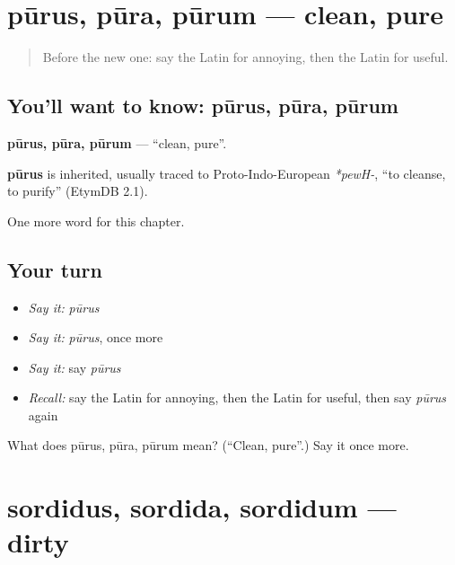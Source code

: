 \section[pūrus, pūra, pūrum]{pūrus, pūra, pūrum — clean, pure}

\label{lesson:LA-C146-purus}



\begin{quote}
Before the new one: say the Latin for annoying, then the Latin for useful.
\end{quote}

\subsection*{You'll want to know: pūrus, pūra, pūrum}
\textbf{pūrus, pūra, pūrum} — \textquotedblleft{}clean, pure\textquotedblright{}.

\begin{cousinweb}
\textbf{pūrus} is inherited, usually traced to Proto-Indo-European \emph{*pewH-}, \textquotedblleft{}to cleanse, to purify\textquotedblright{} (EtymDB 2.1).
\end{cousinweb}

\begin{grammarlens}[title={What you've built}]
One more word for this chapter.
\end{grammarlens}

\subsection*{Your turn}
\begin{itemize}
\raggedright
  \item \emph{Say it:} \emph{pūrus}
  \item \emph{Say it:} \emph{pūrus}, once more
  \item \emph{Say it:} say \emph{pūrus}
  \item \emph{Recall:} say the Latin for annoying, then the Latin for useful, then say \emph{pūrus} again
\end{itemize}

\begin{tcolorbox}[breakable,colback=teal!4,colframe=teal!35!black,title={Before you move on}]
What does pūrus, pūra, pūrum mean? (\textquotedblleft{}Clean, pure\textquotedblright{}.) Say it once more.
\end{tcolorbox}
\section[sordidus, sordida, sordidum]{sordidus, sordida, sordidum — dirty}

